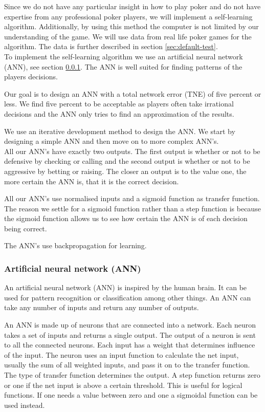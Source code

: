 Since we do not have any particular insight in how to play poker and do not have expertise from any professional poker players, we will implement a self-learning algorithm. Additionally, by using this method the computer is not limited by our understanding of the game. We will use data from real life poker games for the algorithm. The data is further described in section \ref{sec:default-test}.\\

To implement the self-learning algorithm we use an artificial neural network (ANN), see section \ref{sec:nn}. The ANN is well suited for finding patterns of the players decisions. 

Our goal is to design an ANN with a total network error (TNE) of five percent or less. We find five percent to be acceptable as players often take irrational decisions and the ANN only tries to find an approximation of the results. 

We use an iterative development method to design the ANN. We start by designing a simple ANN and then move on to more complex ANN's.\\

All our ANN's have exactly two outputs. The first output is whether or not to be defensive by checking or calling and the second output is whether or not to be aggressive by betting or raising. The closer an output is to the value one, the more certain the ANN is, that it is the correct decision. 

All our ANN's use normalised inputs and a sigmoid function as transfer function. The reason we settle for a sigmoid function rather than a step function is because the sigmoid function allows us to see how certain the ANN is of each decision being correct.

The ANN's use backpropagation for learning.

\subsubsection{Artificial neural network (ANN)}
\label{sec:nn}
An artificial neural network (ANN) is inspired by the human brain. It can be used for pattern recognition or classification among other things. An ANN can take any number of inputs and return any number of outputs. 

An ANN is made up of neurons that are connected into a network. Each neuron takes a set of inputs and returns a single output. The output of a neuron is sent to all the connected neurons. Each input has a weight that determines influence of the input. The neuron uses an input function to calculate the net input, usually the sum of all weighted inputs, and pass it on to the transfer function. The type of transfer function determines the output. A step function returns zero or one if the net input is above a certain threshold. This is useful for logical functions. If one needs a value between zero and one a sigmoidal function can be used instead.

